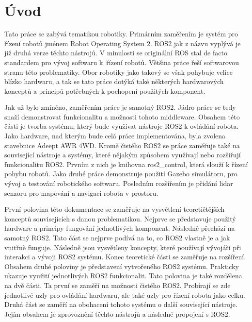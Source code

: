 
%

\chapter{Úvod}
Tato práce se zabývá tematikou robotiky. Primárním zaměřením je systém pro řízení robotů jménem Robot Operating System 2. ROS2 jak z názvu vyplývá je již druhá verze těchto nástrojů. V minulosti se originální ROS stal de facto standardem pro vývoj softwaru k~řízení robotů. Většina práce řeší softwarovou stranu této problematiky. Obor robotiky jako takový se však pohybuje velice blízko hardwaru, a tak se tato práce dotýká také některých hardwarových konceptů a principů potřebných k pochopení použitých komponent.

Jak už bylo zmíněno, zaměřením práce je samotný ROS2. Jádro práce se tedy snaží demonstrovat funkcionalitu a možnosti tohoto middleware. Obsahem této části je tvorba systému, který bude využívat nástroje ROS2 k ovládání robota. Jako hardware, nad kterým bude celá práce implementována, byla zvolena stavebnice Adeept AWR 4WD. Kromě čistého ROS2 se práce zaměřuje také na související nástroje a systémy, které nějakým způsobem využívají nebo rozšiřují funkcionalitu ROS2. Prvním z nich je knihovna ros2\_control, která slouží k řízení pohybu robotů. Jako druhé práce demonstruje použití Gazebo simulátoru, pro vývoj a testování robotického softwaru. Posledním rozšířením je přidání lidar senzoru pro mapování a navigaci robota v prostoru.

První polovina této dokumentace se zaměřuje na vysvětlení teoretičtějších konceptů souvisejících s danou problematikou. Nejprve se představuje použitý hardware a principy fungování jednotlivých komponent. Následně přechází na samotný ROS2. Tato část se nejprve podívá na to, co ROS2 vlastně je a jak vnitřně funguje. Následně jsou vysvětleny koncepty, které používají vývojáři při interakci a vývoji ROS2 systému. Konec teoretické části se zaměřuje na rozšíření.
Obsahem druhé poloviny je představení vytvořeného ROS2 systému. Prakticky ukazuje využití jednotlivých ROS2 funkcionalit. Tato polovina je také rozdělena na dvě části. Ta první se zaměří na možnosti čistého ROS2. Probírají se zde jednotlivé uzly pro ovládání hardwaru, ale také uzly pro řízení robota jako celku. Druhá část se zaměří na obohacení tohoto systému o další související nástroje. Jejím obsahem je zprovoznění těchto nástrojů a následné propojení s ROS2.

